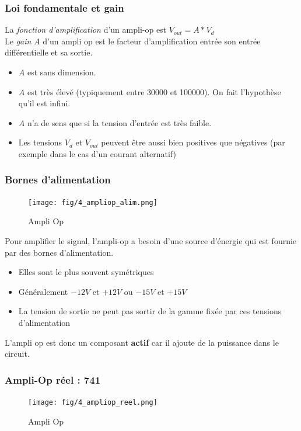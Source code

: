 \documentclass[a4paper]{article}
\begin{document}
        \subsubsection{Loi fondamentale et gain}
        La \textit{fonction d'amplification} d'un ampli-op est $ V_{out} = A*V_{d} $ \\
        Le \textit{gain} $A$ d'un ampli op est le facteur d'amplification entrée son entrée différentielle et sa sortie. \\
        \begin{itemize}
            \item $A$ est sans dimension.
            \item $A$ est très élevé (typiquement entre 30000 et 100000). On fait l'hypothèse qu'il est infini.
            \item $A$ n'a de sens que si la tension d'entrée est très faible.
            \item Les tensions $V_{d}$ et $V_{out}$ peuvent être aussi bien positives que négatives (par exemple dans le cas d'un courant alternatif)
        \end{itemize}

        \subsubsection{Bornes d'alimentation}
            \begin{figure}[H]
                \begin{center}
                    \texttt{[image: fig/4\_ampliop\_alim.png]}
                    \caption{Ampli Op}
                \end{center}
            \end{figure}
            Pour amplifier le signal, l'ampli-op a besoin d'une source d'énergie qui est fournie par des bornes d'alimentation.\\
            \begin{itemize}
                \item Elles sont le plus souvent symétriques
                \item Généralement $-12V$ et $+12V$ ou $-15V$ et $+15V$
                \item La tension de sortie ne peut pas sortir de la gamme fixée par ces tensions d'alimentation
            \end{itemize}
            L'ampli op est donc un composant \textbf{actif} car il ajoute de la puissance dans le circuit.
        \subsubsection{Ampli-Op réel : 741}
            \begin{figure}[H]
                \begin{center}
                    \texttt{[image: fig/4\_ampliop\_reel.png]}
                    \caption{Ampli Op}
                \end{center}
            \end{figure}
\end{document}
